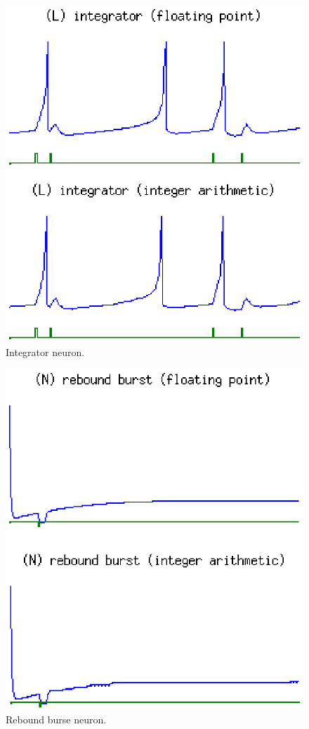 \documentclass[journal]{./sty/IEEEtran}
\begin{document}
\begin{figure}
\centering
\includegraphics[scale=0.6]{imgs/izh_integrator}
\caption{Integrator neuron.}
\end{figure}

\begin{figure}
\centering
\includegraphics[scale=0.6]{imgs/izh_rebound_burst}
\caption{Rebound burse neuron.}
\end{figure}
\end{document}
